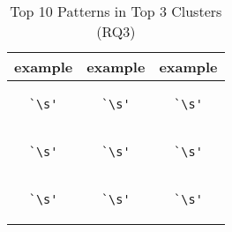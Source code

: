 
\begin{table}
\begin{center}
\caption{Top 10 Patterns in Top 3 Clusters (RQ3)}
\label{table:threeClusterSample}

\begin{tabular}
{c|c|c}
\toprule
example & example & example\\
\midrule
\begin{minipage}{0.5in}\begin{verbatim}`\s'\end{verbatim}\end{minipage} & \begin{minipage}{0.5in}\begin{verbatim}`\s'\end{verbatim}\end{minipage} & \begin{minipage}{0.5in}\begin{verbatim}`\s'\end{verbatim}\end{minipage}\\
\midrule
\begin{minipage}{0.5in}\begin{verbatim}`\s'\end{verbatim}\end{minipage} & \begin{minipage}{0.5in}\begin{verbatim}`\s'\end{verbatim}\end{minipage} & \begin{minipage}{0.5in}\begin{verbatim}`\s'\end{verbatim}\end{minipage}\\
\midrule
\begin{minipage}{0.5in}\begin{verbatim}`\s'\end{verbatim}\end{minipage} & \begin{minipage}{0.5in}\begin{verbatim}`\s'\end{verbatim}\end{minipage} & \begin{minipage}{0.5in}\begin{verbatim}`\s'\end{verbatim}\end{minipage}\\

\end{tabular}
\end{center}
\end{table}

